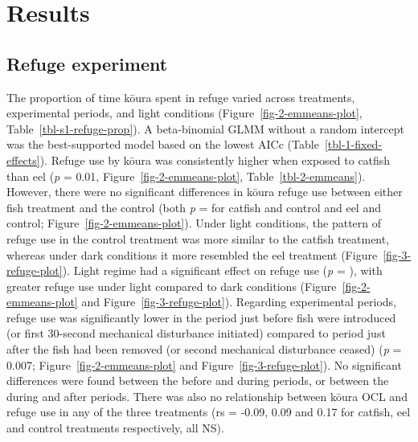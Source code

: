 \documentclass[
  letterpaper,
  DIV=11,
  numbers=noendperiod]{scrartcl}
\begin{document}
\section{Results}\label{results}

\subsection{Refuge experiment}\label{refuge-experiment-1}

The proportion of time kōura spent in refuge varied across treatments,
experimental periods, and light conditions
(Figure~\ref{fig-2-emmeans-plot}, Table~\ref{tbl-s1-refuge-prop}). A
beta-binomial GLMM without a random intercept was the best-supported
model based on the lowest AICc (Table~\ref{tbl-1-fixed-effects}). Refuge
use by kōura was consistently higher when exposed to catfish than eel
(\emph{p} = 0.01, Figure~\ref{fig-2-emmeans-plot},
Table~\ref{tbl-2-emmeans}). However, there were no significant
differences in kōura refuge use between either fish treatment and the
control (both \emph{p} = for catfish and control and eel and control;
Figure~\ref{fig-2-emmeans-plot}). Under light conditions, the pattern of
refuge use in the control treatment was more similar to the catfish
treatment, whereas under dark conditions it more resembled the eel
treatment (Figure~\ref{fig-3-refuge-plot}). Light regime had a
significant effect on refuge use (\emph{p} = ), with greater refuge use
under light compared to dark conditions (Figure~\ref{fig-2-emmeans-plot}
and Figure~\ref{fig-3-refuge-plot}). Regarding experimental periods,
refuge use was significantly lower in the period just before fish were
introduced (or first 30-second mechanical disturbance initiated)
compared to period just after the fish had been removed (or second
mechanical disturbance ceased) (\emph{p} = 0.007;
Figure~\ref{fig-2-emmeans-plot} and Figure~\ref{fig-3-refuge-plot}). No
significant differences were found between the before and during
periods, or between the during and after periods. There was also no
relationship between kōura OCL and refuge use in any of the three
treatments (rs = -0.09, 0.09 and 0.17 for catfish, eel and control
treatments respectively, all NS).
\end{document}
